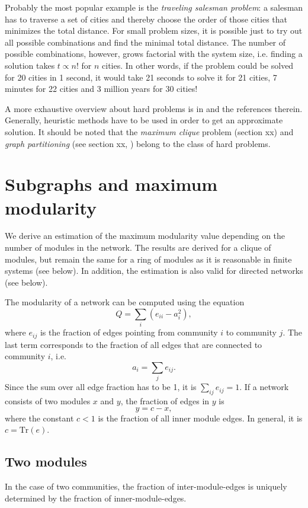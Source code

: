 \documentclass[openright,twoside,headsepline]{scrbook}
\begin{document}
Probably the most popular example is the \emph{traveling salesman problem}: a salesman has to traverse a set of cities and thereby choose the order of those cities that minimizes the total distance.
For small problem sizes, it is possible just to try out all possible combinations and find the minimal total distance.
The number of possible combinations, however, grows factorial with the system size, i.e. finding a solution takes $t\propto n!$ for $n$ cities.
In other words, if the problem could be solved for 20 cities in 1 second, it would take 21 seconds to solve it for 21 cities, 7 minutes for 22 cities and 3 million years for 30 cities!

A more exhaustive overview about hard problems is in \citep{algorithm_design} and the references therein.
Generally, heuristic methods have to be used in order to get an approximate solution.
It should be noted that the \emph{maximum clique} problem (section xx) and \emph{graph partitioning} (see section xx, \citep{brandes2007}) belong to the class of hard problems.

\section{Subgraphs and maximum modularity}
We derive an estimation of the maximum modularity value depending on the number of modules in the network.
The results are derived for a clique of modules, but remain the same for a ring of modules as it is reasonable in finite systems (see below).
In addition, the estimation is also valid for directed networks (see below).

The modularity of a network can be computed using the equation
\begin{equation}\label{eq:mod_undir}
Q=\sum _i \left( e_{ii}-a_i^2 \right),
\end{equation}
where $e_{ij}$ is the fraction of edges pointing from community $i$ to community $j$.
The last term corresponds to the fraction of all edges that are connected to community $i$, i.e.
\[
a_i = \sum _j e_{ij}.
\]
Since the sum over all edge fraction has to be 1, it is $\sum _{ij}e_{ij}=1$.
If a network consists of two modules $x$ and $y$, the fraction of edges in $y$ is
\begin{equation}\label{qmaxbedingung}
y=c-x,
\end{equation}
where the constant $c<1$ is the fraction of all inner module edges.
In general, it is $c=\mathrm{Tr} (e)$.

\subsection{Two modules}
In the case of two communities, the fraction of inter-module-edges is uniquely determined by the fraction of inner-module-edges.
\end{document}
